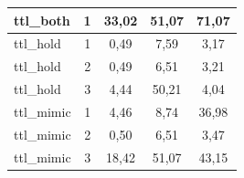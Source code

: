 \begin{table}[!ht]
\begin{tabular}{|l|c|c|c|c|}
        ttl\_both & 1 & 33,02 & 51,07 & 71,07 \\
        \hline
        ttl\_hold & 1 & 0,49 & 7,59 & 3,17 \\
        \hline
        ttl\_hold & 2 & 0,49 & 6,51 & 3,21 \\
        \hline
        ttl\_hold & 3 & 4,44 & 50,21 & 4,04 \\
        \hline
        ttl\_mimic & 1 & 4,46 & 8,74 & 36,98 \\
        \hline
        ttl\_mimic & 2 & 0,50 & 6,51 & 3,47 \\
        \hline
        ttl\_mimic & 3 & 18,42 & 51,07 & 43,15 \\
        \hline
    \end{tabular}
    \label{tab:anexa-evaziune}
\end{table}
